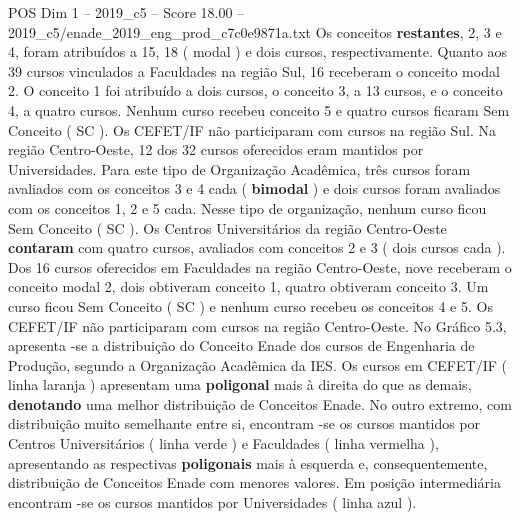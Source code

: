 \begin{textsample}{POS Dim 1 – 2019\_c5 – Score 18.00 – 2019\_c5/enade\_2019\_eng\_prod\_c7c0e9871a.txt}
Os conceitos \textbf{restantes}, 2, 3 e 4, foram atribuídos a 15, 18 ( modal ) e dois cursos, respectivamente.
Quanto aos 39 cursos vinculados a Faculdades na região Sul, 16 receberam o conceito modal 2.
O conceito 1 foi atribuído a dois cursos, o conceito 3, a 13 cursos, e o conceito 4, a quatro cursos.
Nenhum curso recebeu conceito 5 e quatro cursos ficaram Sem Conceito ( SC ).
Os CEFET/IF não participaram com cursos na região Sul.
Na região Centro-Oeste, 12 dos 32 cursos oferecidos eram mantidos por Universidades.
Para este tipo de Organização Acadêmica, três cursos foram avaliados com os conceitos 3 e 4 cada ( \textbf{bimodal} ) e dois cursos foram avaliados com os conceitos 1, 2 e 5 cada.
Nesse tipo de organização, nenhum curso ficou Sem Conceito ( SC ).
Os Centros Universitários da região Centro-Oeste \textbf{contaram} com quatro cursos, avaliados com conceitos 2 e 3 ( dois cursos cada ).
Dos 16 cursos oferecidos em Faculdades na região Centro-Oeste, nove receberam o conceito modal 2, dois obtiveram conceito 1, quatro obtiveram conceito 3.
Um curso ficou Sem Conceito ( SC ) e nenhum curso recebeu os conceitos 4 e 5.
Os CEFET/IF não participaram com cursos na região Centro-Oeste.
No Gráfico 5.3, apresenta -se a distribuição do Conceito Enade dos cursos de Engenharia de Produção, segundo a Organização Acadêmica da IES.
Os cursos em CEFET/IF ( linha laranja ) apresentam uma \textbf{poligonal} mais à direita do que as demais, \textbf{denotando} uma melhor distribuição de Conceitos Enade.
No outro extremo, com distribuição muito semelhante entre si, encontram -se os cursos mantidos por Centros Universitários ( linha verde ) e Faculdades ( linha vermelha ), apresentando as respectivas \textbf{poligonais} mais à esquerda e, consequentemente, distribuição de Conceitos Enade com menores valores.
Em posição intermediária encontram -se os cursos mantidos por Universidades ( linha azul ).

\end{textsample}
